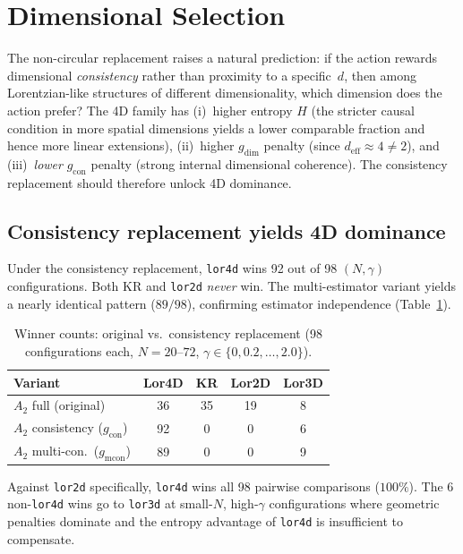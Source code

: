 \documentclass[12pt,a4paper]{article}
\begin{document}
\section{Dimensional Selection}
\label{sec:dimensional}

The non-circular replacement raises a natural prediction: if the action rewards
dimensional \emph{consistency} rather than proximity to a specific~$d$, then
among Lorentzian-like structures of different dimensionality, which dimension
does the action prefer? The 4D family has (i)~higher entropy $H$ (the stricter
causal condition in more spatial dimensions yields a lower comparable fraction
and hence more linear extensions), (ii)~higher $g_{\text{dim}}$ penalty (since
$d_{\mathrm{eff}} \approx 4 \neq 2$), and (iii)~\emph{lower} $g_{\text{con}}$
penalty (strong internal dimensional coherence). The consistency replacement
should therefore unlock 4D dominance.

\subsection{Consistency replacement yields 4D dominance}
\label{sec:4d_dominance}

Under the consistency replacement, \texttt{lor4d} wins 92 out of 98
$(N, \gamma)$ configurations. Both KR and \texttt{lor2d} \emph{never} win. The
multi-estimator variant yields a nearly identical pattern ($89/98$), confirming
estimator independence (Table~\ref{tab:replacement}).

\begin{table}[h]
\centering
\caption{Winner counts: original vs.\ consistency replacement (98
configurations each, $N = 20$--$72$, $\gamma \in \{0, 0.2, \ldots, 2.0\}$).}
\label{tab:replacement}
\begin{tabular}{lcccc}
\toprule
\textbf{Variant} & \textbf{Lor4D} & \textbf{KR} & \textbf{Lor2D} &
\textbf{Lor3D} \\
\midrule
$A_2$ full (original) & 36 & 35 & 19 & 8 \\
$A_2$ consistency ($g_{\text{con}}$) & 92 & 0 & 0 & 6 \\
$A_2$ multi-con.\ ($g_{\text{mcon}}$) & 89 & 0 & 0 & 9 \\
\bottomrule
\end{tabular}
\end{table}

Against \texttt{lor2d} specifically, \texttt{lor4d} wins all 98 pairwise
comparisons ($100\%$). The 6 non-\texttt{lor4d} wins go to \texttt{lor3d} at
small-$N$, high-$\gamma$ configurations where geometric penalties dominate and
the entropy advantage of \texttt{lor4d} is insufficient to compensate.
\end{document}
